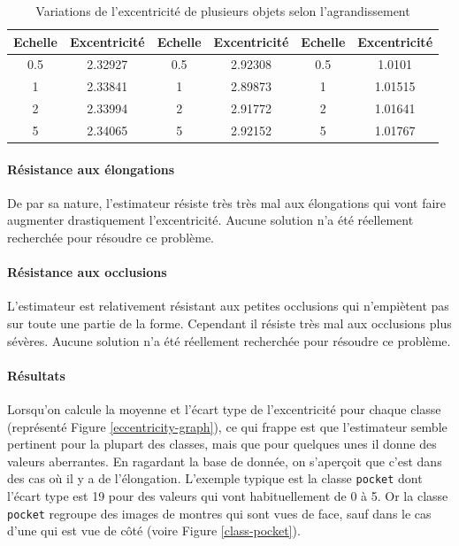 \documentclass{article}
\theoremstyle{definition}
\begin{document}
\begin{table}[!h]
\begin{tabular}{|c|c|c|c|c|c|}
	    \hline
	    \textbf{Echelle} & \textbf{Excentricité} & \textbf{Echelle} & \textbf{Excentricité} & \textbf{Echelle} & \textbf{Excentricité} \\
	    \hline
	    0.5 & 2.32927 & 0.5 & 2.92308 & 0.5 & 1.0101 \\
	    \hline
	    1 & 2.33841 & 1 & 2.89873 & 1 & 1.01515 \\
	    \hline
	    2 & 2.33994 & 2 & 2.91772 & 2 & 1.01641 \\
	    \hline
	    5 & 2.34065 & 5 & 2.92152 & 5 & 1.01767 \\
	    \hline
	  \end{tabular}
	  \caption{Variations de l'excentricité de plusieurs objets selon l'agrandissement}
	  \label{excentricité-scaling-table}
	  \end{table}  
	  
	\paragraph{Résistance aux élongations}
	
	  De par sa nature, l'estimateur résiste très très mal aux élongations qui vont faire augmenter drastiquement l'excentricité. Aucune solution n'a été réellement recherchée pour résoudre ce problème.
	
	\paragraph{Résistance aux occlusions}
	  
	  L'estimateur est relativement résistant aux petites occlusions qui n'empiètent pas sur toute une partie de la forme. Cependant il résiste très mal aux occlusions plus sévères. Aucune solution n'a été réellement recherchée pour résoudre ce problème.
	  
	\paragraph{Résultats}
	
	  Lorsqu'on calcule la moyenne et l'écart type de l'excentricité pour chaque classe (représenté Figure \ref{eccentricity-graph}), ce qui frappe est que l'estimateur semble pertinent pour la plupart des classes, mais que pour quelques unes il donne des valeurs aberrantes. En ragardant la base de donnée, on s'aperçoit que c'est dans des cas où il y a de l'élongation. L'exemple typique est la classe \texttt{pocket} dont l'écart type est 19 pour des valeurs qui vont habituellement de 0 à 5. Or la classe \texttt{pocket} regroupe des images de montres qui sont vues de face, sauf dans le cas d'une qui est vue de côté (voire Figure \ref{class-pocket}).  \\
	
\end{document}
